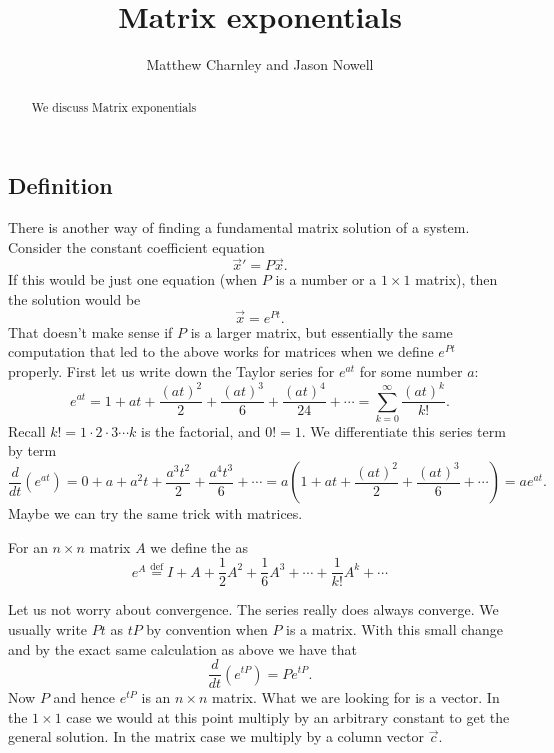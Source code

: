 \documentclass{ximera}
\title{Matrix exponentials}
\author{Matthew Charnley and Jason Nowell}
\begin{document}
\begin{abstract}
    We discuss Matrix exponentials
\end{abstract}
\maketitle

\label{sec:matexp}

\subsection{Definition}

There is another way of finding a fundamental matrix solution of a system.  Consider the constant coefficient equation
\begin{equation*}
    {\vec{x}}' = P \vec{x} .
\end{equation*}
If this would be just one equation (when $P$ is a number or a $1 \times 1$ matrix), then the solution would be
\begin{equation*}
    \vec{x} = e^{Pt} .
\end{equation*}
That doesn't make sense if $P$ is a larger matrix, but essentially the same computation that led to the above works for matrices when we define $e^{Pt}$ properly.  First let us write down the Taylor series for $e^{at}$ for some number $a$:
\begin{equation*}
    e^{at} = 1 + at + \frac{{(at)}^2}{2} + \frac{{(at)}^3}{6} + \frac{{(at)}^4}{24} + \cdots = \sum_{k=0}^\infty \frac{{(at)}^k}{k!} .
\end{equation*}
Recall $k! = 1 \cdot 2 \cdot 3 \cdots k$ is the factorial, and $0! = 1$. We differentiate this series term by term
\begin{equation*}
    \frac{d}{dt} \left(e^{at} \right) =  0 + a + a^2 t + \frac{a^3t^2}{2} + \frac{a^4t^3}{6} + \cdots = a \left( 1 + a t + \frac{{(at)}^2}{2} + \frac{{(at)}^3}{6} + \cdots \right) = a e^{at}.
\end{equation*}
Maybe we can try the same trick with matrices.
\begin{definition}
    For an $n \times n$ matrix $A$ we define the \emph{} as 
    \begin{equation*}
        e^A \overset{\text{def}}{=} I + A + \frac{1}{2} A^2 + \frac{1}{6} A^3 + \cdots + \frac{1}{k!} A^k + \cdots
    \end{equation*}
\end{definition}
Let us not worry about convergence.  The series really does always converge. We usually write $Pt$ as $tP$ by convention when $P$ is a matrix. With this small change and by the exact same calculation as above we have that
\begin{equation*}
    \frac{d}{dt} \left(e^{tP} \right) = P e^{tP} .
\end{equation*}
Now $P$ and hence $e^{tP}$ is an $n \times n$ matrix.  What we are looking for is a vector.  In the $1 \times 1$ case we would at this point multiply by an arbitrary constant to get the general solution.  In the matrix case we multiply by a column vector $\vec{c}$.
\end{document}
